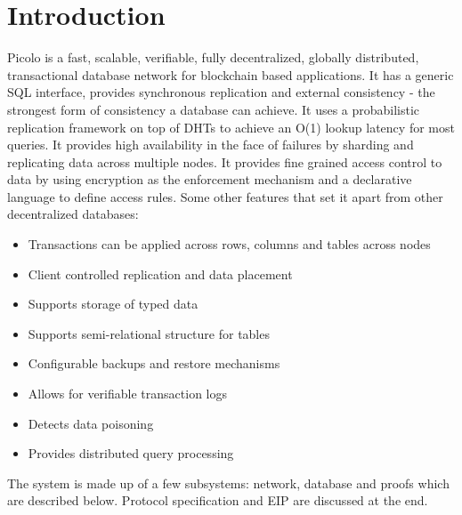 \documentclass[preprint,10pt]{elsarticle}
\begin{document}
\section{Introduction}\label{Sect:Introduction}
Picolo is a fast, scalable, verifiable, fully decentralized, globally distributed, transactional database network for
blockchain based applications. It has a generic SQL interface, provides synchronous replication and external consistency - the strongest form of consistency a database can achieve. It uses a probabilistic replication framework on top of DHTs to achieve an O(1) lookup latency for most queries. It provides high availability in the face of failures by sharding and replicating data across multiple nodes. It provides fine grained access control to data by using encryption as the enforcement mechanism and a declarative language to define access rules. Some other features that set it apart from other decentralized databases:
\begin{itemize}
    \item Transactions can be applied across rows, columns and tables across nodes
    \item Client controlled replication and data placement
    \item Supports storage of typed data
    \item Supports semi-relational structure for tables
    \item Configurable backups and restore mechanisms
   	\item Allows for verifiable transaction logs
   	\item Detects data poisoning
   	\item Provides distributed query processing
\end{itemize}
The system is made up of a few subsystems: network, database and proofs which are described below. Protocol specification and EIP are discussed at the end.

\end{document}
